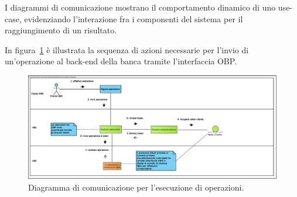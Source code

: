 
I diagrammi di comunicazione mostrano il comportamento dinamico di uno use-case, evidenziando l'interazione fra i componenti del sistema per il raggiungimento di un risultato.

In figura~\ref{fig:communication:obp} è illustrata la sequenza di azioni necessarie per l'invio di un'operazione al back-end della banca tramite l'interfaccia OBP.

\begin{figure}[h]
    \centering
    \includegraphics[width=\textheight, angle=90]{Images/Comunicazione_OBP.eps}
    \caption{Diagramma di comunicazione per l'esecuzione di operazioni.}
    \label{fig:communication:obp}
\end{figure}


